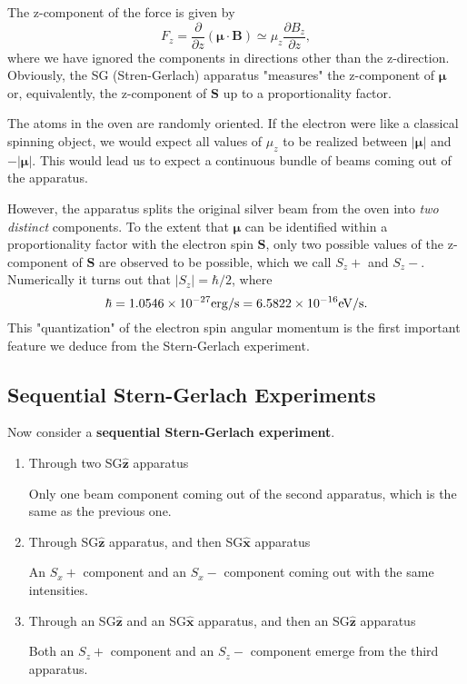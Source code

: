 \documentclass[11pt]{elegantbook}
\begin{document}
The z-component of the force is given by 
\begin{equation}
  F_z=\frac{\partial}{\partial z}(\bm{\mu}\cdot \bm{B})\simeq\mu_z\frac{\partial B_z}{\partial z},
\end{equation}
where we have ignored the components in directions other than the z-direction. Obviously, 
the SG (Stren-Gerlach) apparatus "measures" the z-component of $\bm{\mu}$ or, equivalently, 
the z-component of $\bm{S}$ up to a proportionality factor.

The atoms in the oven are randomly oriented. If the electron were like a classical spinning 
object, we would expect all values of $\mu_z$ to be realized between $\vert\bm{\mu}\vert$ and $-\vert\bm{\mu}\vert$. 
This would lead us to expect a continuous bundle of beams coming out of the apparatus.

However, the apparatus splits the original silver beam from the oven into \textit{two distinct} components. 
To the extent that $\bm{\mu}$ can be identified within a proportionality factor with the electron spin 
$\bm{S}$, only two possible values of the z-component of $\bm{S}$ are observed to be possible, which 
we call $S_z+$ and $S_z-$. Numerically it turns out that $\vert S_z\vert=\hbar/2$, where
\begin{equation}
  \hbar=1.0546\times 10^{-27}\rm{erg/s}=6.5822\times 10^{-16}\rm{eV/s}.
\end{equation}
This "quantization" of the electron spin angular momentum is the first important feature 
we deduce from the Stern-Gerlach experiment.

\subsection{Sequential Stern-Gerlach Experiments}

Now consider a \textbf{sequential Stern-Gerlach experiment}.
\begin{enumerate}
  \item Through two SG$\hat{\bm{z}}$ apparatus
  
  Only one beam component coming out of the second apparatus, which is the same as the previous one.
  \item Through SG$\hat{\bm{z}}$ apparatus, and then SG$\hat{\bm{x}}$ apparatus
  
  An $S_x+$ component and an $S_x-$ component coming out with the same intensities.
  \item Through an SG$\hat{\bm{z}}$ and an SG$\hat{\bm{x}}$ apparatus, and then an SG$\hat{\bm{z}}$ apparatus
  
  Both an $S_z+$ component and an $S_z-$ component emerge from the third apparatus.
\end{enumerate}
\end{document}
